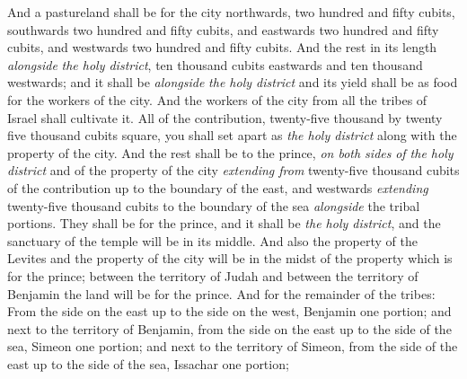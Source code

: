 \begin{biblechapter}
\verse And a pastureland shall be for the city northwards, two hundred and fifty cubits, southwards two hundred and fifty cubits, and eastwards two hundred and fifty cubits, and westwards two hundred and fifty cubits.
\verse And the rest in its length \textit{alongside} \textit{the holy district}, ten thousand cubits eastwards and ten thousand westwards; and it shall be \textit{alongside} \textit{the holy district} and its yield shall be as food for the workers of the city.
\verse And the workers of the city from all the tribes of Israel shall cultivate it.
\verse All of the contribution, twenty-five thousand by twenty five thousand cubits square, you shall set apart as \textit{the holy district} along with the property of the city.
\verse And the rest shall be to the prince, \textit{on both sides} \textit{of the holy district} and of the property of the city \textit{extending from} twenty-five thousand cubits of the contribution up to the boundary of the east, and westwards \textit{extending} twenty-five thousand cubits to the boundary of the sea \textit{alongside} the tribal portions. They shall be for the prince, and it shall be \textit{the holy district}, and the sanctuary of the temple will be in its middle.
\verse And also the property of the Levites and the property of the city will be in the midst of the property which is for the prince; between the territory of Judah and between the territory of Benjamin the land will be for the prince.
\verse And for the remainder of the tribes: From the side on the east up to the side on the west, Benjamin one portion;
\verse and next to the territory of Benjamin, from the side on the east up to the side of the sea, Simeon one portion;
\verse and next to the territory of Simeon, from the side of the east up to the side of the sea, Issachar one portion;

\end{biblechapter}
